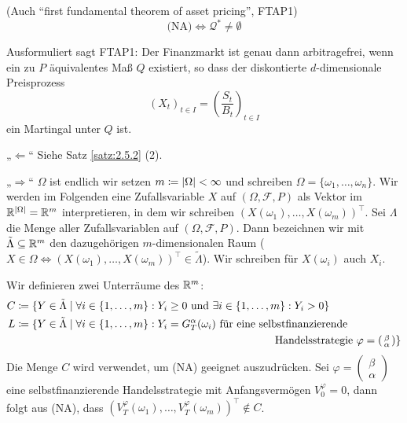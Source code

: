 \documentclass[a4paper,twoside,DIV15,BCOR12mm]{scrbook}
\newcommand{\cF}{\mathcal F}
\newcommand{\cQ}{\mathcal Q}
\begin{document}
\begin{satz}
(Auch “first fundamental theorem of asset pricing”, FTAP1)\label{satz:2.5.4}
\[
\text{(NA)} \iff \cQ^* \ne\emptyset
\]
\end{satz}

\begin{bemerkung}
Ausformuliert sagt FTAP1: Der Finanzmarkt ist genau dann arbitragefrei, wenn ein zu $P$ äquivalentes Maß $Q$ existiert, so dass der diskontierte $d$-dimensionale Preisprozess
\[
(X_t)_{t\in I} =\left( \frac{S_t}{B_t}\right)_{t\in I}
\]
ein Martingal unter $Q$ ist.
\end{bemerkung}

\begin{beweis}
„$\Longleftarrow$“ Siehe Satz \ref{satz:2.5.2} (2).

„$\Longrightarrow$“ $\Omega$ ist endlich wir setzen $m\da |\Omega|<\infty$ und schreiben $\Omega = \{\omega_1,\ldots, \omega_n\}$. Wir werden im Folgenden eine Zufallsvariable $X$ auf $(\Omega,\cF, P)$ als Vektor im $\mathbb{R}^{|\Omega|} =\mathbb{R}^m$ interpretieren, in dem wir schreiben $(X(\omega_1),\ldots,X(\omega_m))^\top$. Sei $\Lambda$ die Menge aller Zufallsvariablen auf $(\Omega,\cF, P)$. Dann bezeichnen wir mit $\tilde\Lambda\subseteq \mathbb{R}^m$ den dazugehörigen $m$-dimensionalen Raum ($X\in\Omega\iff (X(\omega_1),\ldots,X(\omega_m))^\top\in \tilde\Lambda$). Wir schreiben für $X(\omega_i)$ auch $X_i$.

Wir definieren zwei Unterräume des $\mathbb{R}^m$:
\begin{align*}
C &\da \{ Y\in \tilde\Lambda\mid \forall i\in\{1,\ldots,m\}: Y_i \ge 0 \text{ und } \exists i\in\{1,\ldots,m\}: Y_i > 0\} \\
L &\da \{ Y\in \tilde\Lambda\mid \forall i\in\{1,\ldots,m\}: Y_i = G_T^\alpha(\omega_i) \text{ für eine selbstfinanzierende} \\
&\hspace{24em}\text{Handelsstrategie } 
\varphi=\left(\begin{smallmatrix} \beta \\ \alpha \end{smallmatrix}\right)\}
\end{align*}
Die Menge $C$ wird verwendet, um (NA) geeignet auszudrücken. Sei 
$\varphi=\left(\begin{smallmatrix} \beta \\ \alpha \end{smallmatrix}\right)$
eine selbstfinanzierende Handelsstrategie mit Anfangsvermögen $V_0^\varphi = 0$, dann folgt aus (NA), dass $(V_T^\varphi(\omega_1),\ldots, V_T^\varphi(\omega_m))^\top\notin C$.


\end{beweis}
\end{document}
